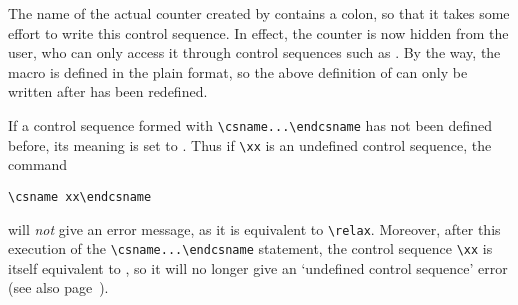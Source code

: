 \documentclass[letterpaper]{book}
\begin{document}
The name of the actual counter created by 
contains a colon, so that it takes some effort to write this
control sequence. In effect, the counter
is now hidden from the user, who can only
access it through control sequences such as .
By the way, the macro  is defined  in
the plain format, so the above definition of 
can only be written after  has been redefined.

If a control sequence formed with \verb>\csname...\endcsname>
has not been defined
before, its meaning is set to .
Thus if \verb=\xx= is an undefined control sequence, the
command
\begin{verbatim}
\csname xx\endcsname
\end{verbatim}
will {\em not\/}
give an error message, as it is equivalent to \verb=\relax=.
Moreover, after this execution of the
\verb-\csname...\endcsname- statement, the control sequence
\verb=\xx= is itself equivalent to , so it
will no longer give an `undefined control sequence' error
(see also page~\pageref{relax:cs}).


\end{document}
